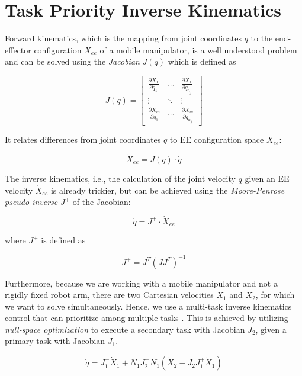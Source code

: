 \section{Task Priority Inverse Kinematics}
	\label{sec:inversekinematics}
Forward kinematics, which is the mapping from joint coordinates $q$ to the end-effector configuration $X_{ee}$ of a mobile manipulator, is a well understood problem and can be solved using the \emph{Jacobian} $J(q)$ which is defined as

\begin{equation}
J(q) =
\begin{bmatrix}
\frac{\partial X_1}{\partial q_1} & \hdots & \frac{\partial X_1}{\partial q_{n_j}} \\
\vdots & \ddots & \vdots \\
\frac{\partial X_m}{\partial q_1} & \hdots & \frac{\partial X_m}{\partial q_{n_j}}
\end{bmatrix}
\end{equation}

It relates differences from joint coordinates $q$ to EE configuration  space $X_{ee}$:

\begin{equation}
\dot{X}_{ee} = J(q) \cdot \dot{q}
\end{equation}

The inverse kinematics, i.e., the calculation of the joint velocity $\dot{q}$ given an EE velocity $\dot{X}_{ee}$ is already trickier, but can be achieved using the \emph{Moore-Penrose pseudo inverse} $J^+$ of the Jacobian:

\begin{equation}
\dot{q} = J^+ \cdot \dot{X}_{ee} 
\end{equation}

where $J^+$ is defined as

\begin{equation}
J^+ = J^T(JJ^T)^{-1}
\end{equation}

Furthermore, because we are working with a mobile manipulator and not a rigidly fixed robot arm, there are two Cartesian velocities $\dot{X}_1$ and $\dot{X}_2$, for which we want to solve simultaneously. Hence, we use a multi-task inverse kinematics control that can prioritize among multiple tasks \citep{nakamura1987task}. This is achieved by utilizing \emph{null-space optimization} to execute a secondary task with Jacobian $J_2$, given a primary task with Jacobian $J_1$.

\begin{equation}
\dot{q} = J_1^+ \dot{X}_1 + N_1 J_2^+ N_1 (\dot{X}_2-J_2J_1^+\dot{X}_1)
\label{eq:task_priority}
\end{equation}


